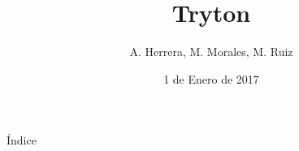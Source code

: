 \documentclass[compress]{beamer}
\title{Tryton}
\author[A. Herrera, M. Morales, M. Ruiz]{A. Herrera, M. Morales, M. Ruiz}
\date{1 de Enero de 2017}
\newcommand{\importsection}[1]{}           %
\begin{document}
	{
		\begin{frame}[plain]
			\titlepage
		\end{frame}
	}

	\importsection{Motivacion.tex}

	\begin{frame}{Índice}
		\hypertarget{index}{}
		\tableofcontents
	\end{frame}

	\importsection{Historia.tex}

	\importsection{Instalacion.tex}

	\importsection{Funcionalidad.tex}

	\importsection{VentajasInconvenientes.tex}

    \importsection{Empresas.tex}
\end{document}
